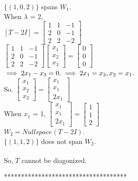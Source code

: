 \documentclass[12pt]{article}
\theoremstyle{definition}
\begin{document}
  $\{(1,0,2)\}$ spans $W_1$.\\
  When $\lambda$ = 2,\\
  $
  [T-2I] = 
  \begin{bmatrix}
  1 & 1 & -1\\
  2 & 0 & -1\\
  2 & 2 & -2
  \end{bmatrix}
  $ \\
  $
  \begin{bmatrix}
  1 & 1 & -1\\
  2 & 0 & -1\\
  2 & 2 & -2
  \end{bmatrix}
  \begin{bmatrix}
  x_1\\
  x_2\\
  x_3
  \end{bmatrix}
  =
  \begin{bmatrix}
  0\\
  0\\
  0
  \end{bmatrix}
  $ \\
  $\implies
  2x_1-x_3 = 0.\\
  \implies 2x_1 = x_3, x_2 = x_1$.\\
  So.
  $
  \begin{bmatrix}
  x_1\\
  x_2\\
  x_3
  \end{bmatrix}
  =
  \begin{bmatrix}
  x_1\\
  x_1\\
  2x_1
  \end{bmatrix}
  $\\
  When $x_1$ = 1,
  $
  \begin{bmatrix}
  x_1\\
  x_1\\
  2x_1
  \end{bmatrix}
  =
  \begin{bmatrix}
  1\\
  1\\
  2
  \end{bmatrix}
  $\\
  $W_2 = Nullspace(T-2I)$.\\ 
  $\{(1,1,2)\}$ does not span $W_2$.\\\\
   So, $T$ cannot be diagonized.
  \begin{center}
  	************************************
  \end{center}
\end{document}
